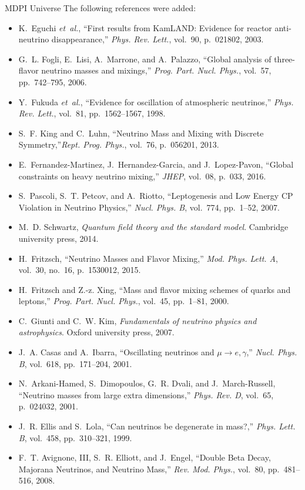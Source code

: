 \documentclass[a4paper, 10pt]{letter}
\begin{document}
\begin{letter}{MDPI Universe}
The following references were added:
\begin{itemize}
    \item K.~Eguchi {\em et~al.}, ``{First results from KamLAND: Evidence for reactor anti-neutrino disappearance},'' {\em Phys. Rev. Lett.}, vol.~90, p.~021802, 2003.
    \item G.~L. Fogli, E.~Lisi, A.~Marrone, and A.~Palazzo, ``{Global analysis of three-flavor neutrino masses and mixings},'' {\em Prog. Part. Nucl. Phys.}, vol.~57, pp.~742--795, 2006.
    \item Y.~Fukuda {\em et~al.}, ``{Evidence for oscillation of atmospheric neutrinos},'' {\em Phys. Rev. Lett.}, vol.~81, pp.~1562--1567, 1998.
    \item S.~F. King and C.~Luhn, ``{Neutrino Mass and Mixing with Discrete Symmetry},''{\em Rept. Prog. Phys.}, vol.~76, p.~056201, 2013.
    \item E.~Fernandez-Martinez, J.~Hernandez-Garcia, and J.~Lopez-Pavon, ``{Global constraints on heavy neutrino mixing},'' {\em JHEP}, vol.~08, p.~033, 2016.
    \item S.~Pascoli, S.~T. Petcov, and A.~Riotto, ``{Leptogenesis and Low Energy CP Violation in Neutrino Physics},'' {\em Nucl. Phys. B}, vol.~774, pp.~1--52, 2007.
    \item M.~D. Schwartz, {\em Quantum field theory and the standard model}. Cambridge university press, 2014.
    \item H.~Fritzsch, ``{Neutrino Masses and Flavor Mixing},'' {\em Mod. Phys. Lett. A}, vol.~30, no.~16, p.~1530012, 2015.
    \item H.~Fritzsch and Z.-z. Xing, ``{Mass and flavor mixing schemes of quarks and leptons},'' {\em Prog. Part. Nucl. Phys.}, vol.~45, pp.~1--81, 2000.
    \item C.~Giunti and C.~W. Kim, {\em Fundamentals of neutrino physics and astrophysics}. Oxford university press, 2007.
    \item J.~A. Casas and A.~Ibarra, ``{Oscillating neutrinos and $\mu \to e, \gamma$},'' {\em Nucl. Phys. B}, vol.~618, pp.~171--204, 2001.
    \item N.~Arkani-Hamed, S.~Dimopoulos, G.~R. Dvali, and J.~March-Russell, ``{Neutrino masses from large extra dimensions},'' {\em Phys. Rev. D}, vol.~65, p.~024032, 2001.    
    \item J.~R. Ellis and S.~Lola, ``{Can neutrinos be degenerate in mass?},'' {\em Phys. Lett. B}, vol.~458, pp.~310--321, 1999.
    \item F.~T. Avignone, III, S.~R. Elliott, and J.~Engel, ``{Double Beta Decay, Majorana Neutrinos, and Neutrino Mass},'' {\em Rev. Mod. Phys.}, vol.~80, pp.~481--516, 2008.

\end{itemize}
\end{letter}
\end{document}

